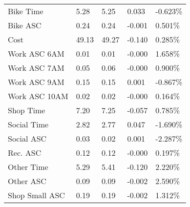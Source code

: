 \begin{table}
\begin{tabular}{lllll}
	                  Bike Time &       5.28 &       5.25 &      0.033 &     -0.623\% \\ 
	                  Bike ASC &       0.24 &       0.24 &     -0.001 &      0.501\% \\ 
	                  Cost &      49.13 &      49.27 &     -0.140 &      0.285\% \\ 
	                  Work ASC 6AM &       0.01 &       0.01 &     -0.000 &      1.658\% \\ 
	                  Work ASC 7AM &       0.05 &       0.06 &     -0.000 &      0.900\% \\ 
	                  Work ASC 9AM &       0.15 &       0.15 &      0.001 &     -0.867\% \\ 
	                  Work ASC 10AM &       0.02 &       0.02 &     -0.000 &      0.164\% \\ 
	                  Shop Time &       7.20 &       7.25 &     -0.057 &      0.785\% \\ 
	                  Social Time &       2.82 &       2.77 &      0.047 &     -1.690\% \\ 
	                  Social ASC &       0.03 &       0.02 &      0.001 &     -2.287\% \\ 
	                  Rec. ASC &       0.12 &       0.12 &     -0.000 &      0.197\% \\ 
	                  Other Time &       5.29 &       5.41 &     -0.120 &      2.220\% \\ 
	                  Other ASC &       0.09 &       0.09 &     -0.002 &      2.590\% \\ 
	                  Shop Small ASC &       0.19 &       0.19 &     -0.002 &      1.312\% \\ 	                
\end{tabular}
\end{table}
